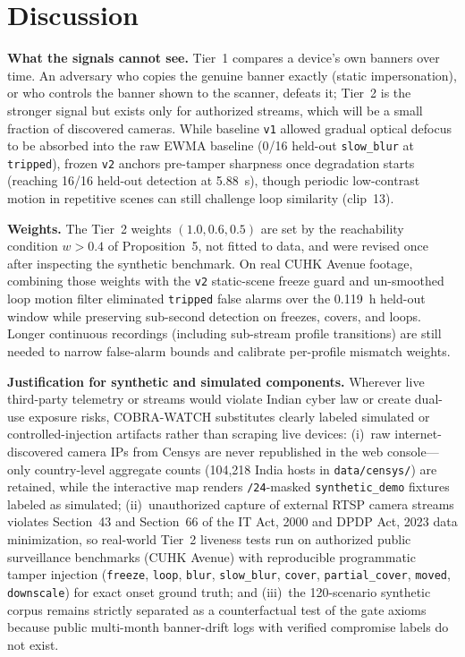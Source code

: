 \documentclass[journal]{IEEEtran}
\begin{document}
\section{Discussion}
\label{sec:discussion}
\textbf{What the signals cannot see.} Tier~1 compares a device's own banners over time. An adversary who copies the genuine banner exactly (static impersonation), or who controls the banner shown to the scanner, defeats it; Tier~2 is the stronger signal but exists only for authorized streams, which will be a small fraction of discovered cameras. While baseline \texttt{v1} allowed gradual optical defocus to be absorbed into the raw EWMA baseline (0/16 held-out \texttt{slow\_blur} at \texttt{tripped}), frozen \texttt{v2} anchors pre-tamper sharpness once degradation starts (reaching 16/16 held-out detection at 5.88~s), though periodic low-contrast motion in repetitive scenes can still challenge loop similarity (clip~13).

\textbf{Weights.} The Tier~2 weights $(1.0,0.6,0.5)$ are set by the reachability condition $w>0.4$ of Proposition~5, not fitted to data, and were revised once after inspecting the synthetic benchmark. On real CUHK Avenue footage, combining those weights with the \texttt{v2} static-scene freeze guard and un-smoothed loop motion filter eliminated \texttt{tripped} false alarms over the 0.119~h held-out window while preserving sub-second detection on freezes, covers, and loops. Longer continuous recordings (including sub-stream profile transitions) are still needed to narrow false-alarm bounds and calibrate per-profile mismatch weights.

\textbf{Justification for synthetic and simulated components.} Wherever live third-party telemetry or streams would violate Indian cyber law or create dual-use exposure risks, COBRA-WATCH substitutes clearly labeled simulated or controlled-injection artifacts rather than scraping live devices: (i)~raw internet-discovered camera IPs from Censys are never republished in the web console---only country-level aggregate counts (104,218 India hosts in \texttt{data/censys/}) are retained, while the interactive map renders \texttt{/24}-masked \texttt{synthetic\_demo} fixtures labeled as simulated; (ii)~unauthorized capture of external RTSP camera streams violates Section~43 and Section~66 of the IT Act, 2000 and DPDP Act, 2023 data minimization, so real-world Tier~2 liveness tests run on authorized public surveillance benchmarks (CUHK Avenue) with reproducible programmatic tamper injection (\texttt{freeze}, \texttt{loop}, \texttt{blur}, \texttt{slow\_blur}, \texttt{cover}, \texttt{partial\_cover}, \texttt{moved}, \texttt{downscale}) for exact onset ground truth; and (iii)~the 120-scenario synthetic corpus remains strictly separated as a counterfactual test of the gate axioms because public multi-month banner-drift logs with verified compromise labels do not exist.
\end{document}
